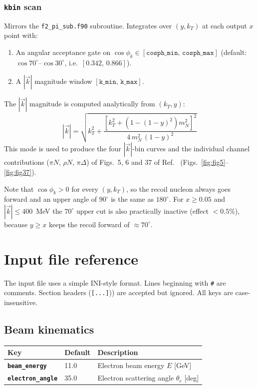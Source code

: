 \documentclass[11pt,a4paper]{article}
\newcommand{\code}[1]{\texttt{#1}}
\newcommand{\inikey}[1]{\texttt{\textbf{#1}}}
\begin{document}
\subsubsection{\code{kbin} scan}

Mirrors the \texttt{f2\_pi\_sub.f90} subroutine.  Integrates over
$(y, k_T)$ at each output $x$ point with:
\begin{enumerate}
  \item An angular acceptance gate on $\cos\phi_k \in [\code{cosph\_min},\,\code{cosph\_max}]$
    (default: $\cos 70^{\circ}$--$\cos 30^{\circ}$, i.e.\ $[0.342,\,0.866]$).
  \item A $|\vec{k}|$ magnitude window $[\code{k\_min},\,\code{k\_max}]$.
\end{enumerate}
The $|\vec{k}|$ magnitude is computed analytically from $(k_T, y)$:
\begin{equation}
  |\vec{k}| = \sqrt{k_T^2 +
    \frac{\left[k_T^2 + (1-(1-y)^2)m_N^2\right]^2}
         {4\,m_N^2\,(1-y)^2}}
\end{equation}
This mode is used to produce the four $|\vec{k}|$-bin curves and the
individual channel contributions ($\pi N$, $\rho N$, $\pi\Delta$) of
Figs.~5, 6 and 37 of Ref.~\cite{TDIS15} (Figs.~\ref{fig:fig5}--\ref{fig:fig37}).

Note that $\cos\phi_k>0$ for every $(y,k_T)$, so the recoil nucleon
always goes forward and an upper angle of $90^\circ$ is the same as
$180^\circ$.  For $x\geq0.05$ and $|\vec{k}|\leq 400$~MeV the
$70^\circ$ upper cut is also practically inactive (effect $<0.5\%$),
because $y\geq x$ keeps the recoil forward of $\approx 70^\circ$.

\section{Input file reference}

The input file uses a simple INI-style format.  Lines beginning with
\texttt{\#} are comments.  Section headers (\texttt{[...]})) are
accepted but ignored.  All keys are case-insensitive.

\subsection{Beam kinematics}

\begin{center}
\begin{tabular}{lll}
\toprule
\textbf{Key} & \textbf{Default} & \textbf{Description} \\
\midrule
\inikey{beam\_energy}    & 11.0  & Electron beam energy $E$ [GeV] \\
\inikey{electron\_angle} & 35.0  & Electron scattering angle $\theta_e$ [deg] \\
\bottomrule
\end{tabular}
\end{center}
\end{document}
